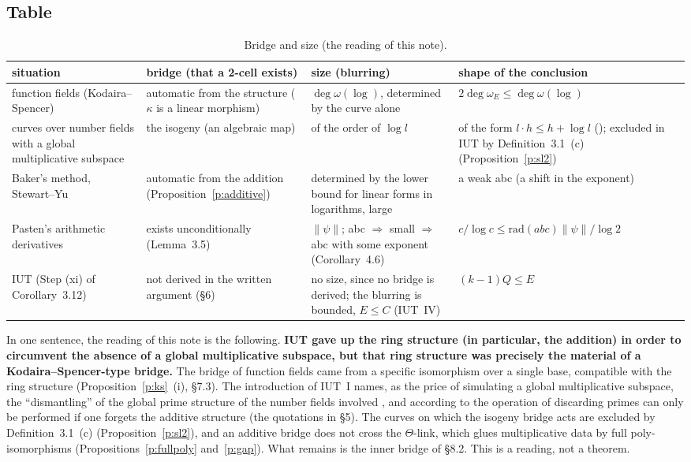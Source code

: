 \documentclass[11pt,a4paper]{article}
\numberwithin{table}{section}
\newcommand{\lab}[2]{{\upshape\fcolorbox{#1}{#1!8}{\scriptsize\sffamily\bfseries\textcolor{#1}{#2}}}}
\newcommand{\tagH}{\lab{BurntOrange}{H}}
\newcommand{\q}[1]{``#1''}
\theoremstyle{plain}
\theoremstyle{definition}
\begin{document}
\subsection{Table}
\begin{table}[ht]\centering\small
\caption{Bridge and size (the reading of this note).}\label{t:dichotomy}
\begin{tabularx}{\textwidth}{@{}>{\raggedright\arraybackslash}p{3.3cm}>{\raggedright\arraybackslash}X
>{\raggedright\arraybackslash}X>{\raggedright\arraybackslash}X@{}}
\toprule
situation & bridge (that a 2-cell exists) & size (blurring) & shape of the conclusion\\
\midrule
function fields (Kodaira--Spencer) & automatic from the structure ($\kappa$ is a linear morphism) &
$\deg\omega(\log)$, determined by the curve alone & $2\deg\omega_E\le\deg\omega(\log)$\\
curves over number fields with a global multiplicative subspace & the isogeny (an algebraic map) & of the order of
$\log l$ & of the form $l\cdot h\le h+\log l$ (\cite[\S2.3]{Alien}); excluded in IUT by Definition~3.1~(c)
(Proposition~\ref{p:sl2})\\
Baker's method, Stewart--Yu & automatic from the addition (Proposition~\ref{p:additive}) & determined by the lower
bound for linear forms in logarithms, large & a weak abc (a shift in the exponent)\\
Pasten's arithmetic derivatives & exists unconditionally (Lemma~3.5) & $\|\psi\|$; abc $\Rightarrow$ small $\Rightarrow$ abc with some exponent (Corollary~4.6) &
$c/\log c\le\mathrm{rad}(abc)\|\psi\|/\log2$\\
IUT (Step (xi) of Corollary~3.12) & not derived in the written argument (\S6) & no size, since no bridge is derived;
the blurring is bounded, $E\le C$ (IUT~IV) & $(k-1)Q\le E$\\
\bottomrule
\end{tabularx}
\end{table}

\tagH{} In one sentence, the reading of this note is the following. \textbf{IUT gave up the ring structure (in
particular, the addition) in order to circumvent the absence of a global multiplicative subspace, but that ring
structure was precisely the material of a Kodaira--Spencer-type bridge.} The bridge of function fields came from a
specific isomorphism over a single base, compatible with the ring structure (Proposition~\ref{p:ks}~(i), \S7.3). The
introduction of IUT~I names, as the price of simulating a global multiplicative subspace, the \q{dismantling} of the
global prime structure of the number fields involved \cite{IUT1}, and according to \cite[\S3.3, (iv)]{Alien} the operation
of discarding primes can only be performed if one forgets the additive structure (the quotations in \S5). The curves on
which the isogeny bridge acts are excluded by Definition~3.1~(c) (Proposition~\ref{p:sl2}), and an additive bridge does
not cross the $\Theta$-link, which glues multiplicative data by full poly-isomorphisms (Propositions~\ref{p:fullpoly}
and~\ref{p:gap}). What remains is the inner bridge of \S8.2. This is a reading, not a theorem.
\end{document}
